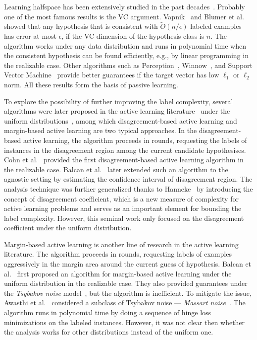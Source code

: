 \documentclass[11pt]{article}
\begin{document}
 Learning halfspace has been extensively studied in the past decades~\cite{blum1996polynomial,klivans2002learning,dunagan2004simple,kalai2008agnostically,shalev2010learning,kearns1994introduction,kearns1994toward,kearns1993learning}. Probably one of the most famous results is the VC argument. Vapnik~\cite{vapnik1982estimations} and Blumer et al.~\cite{blumer1989learnability} showed that any hypothesis that is consistent with $\widetilde O(n/\epsilon)$ labeled examples has error at most $\epsilon$, if the VC dimension of the hypothesis class is $n$. The algorithm works under any data distribution and runs in polynomial time when the consistent hypothesis can be found efficiently, e.g., by linear programming in the realizable case. Other algorithms such as Perception~\cite{minsky1987perceptrons}, Winnow~\cite{littlestone1988learning}, and Support Vector Machine~\cite{vapnik1998statistical} provide better guarantees if the target vector has low $\ell_1$ or $\ell_2$ norm. All these results form the basis of passive learning.

To explore the possibility of further improving the label complexity, several algorithms were later proposed in the active learning literature~\cite{beygelzimer2010agnostic,beygelzimer2016search} under the uniform distributions~\cite{dasgupta2005analysis,freund1993information},
among which disagreement-based active learning and margin-based active learning are two typical approaches. In the disagreement-based active learning, the algorithm proceeds in rounds, requesting the labels of instances in the disagreement region among the current candidate hypothesises.
Cohn et al.~\cite{cohn1994improving} provided the first disagreement-based active learning algorithm in the realizable case. Balcan et al.~\cite{balcan2009agnostic} later extended such an algorithm to the agnostic setting by estimating the confidence interval of disagreement region. The analysis technique was further generalized thanks to Hanneke~\cite{hanneke2007bound} by introducing the concept of disagreement coefficient, which is a new measure of complexity for active learning problems and serves as an important element for bounding the label complexity. However, this seminal work only focused on the disagreement coefficient under the uniform distribution.

Margin-based active learning is another line of research in the active learning literature. The algorithm proceeds in rounds, requesting labels of examples aggressively in the margin area around the current guess of hypothesis. Balcan et al.~\cite{balcan2007margin} first proposed an algorithm for margin-based active learning under the uniform distribution in the realizable case. They also provided guarantees under the \emph{Tsybakov noise} model~\cite{tsybakov2004optimal}, but the algorithm is inefficient. To mitigate the issue, Awasthi et al.~\cite{awasthi2015efficient} considered a subclass of Tsybakov noise --- \emph{Massart noise}~\cite{bousquet2005theory}. The algorithm runs in polynomial time by doing a sequence of hinge loss minimizations on the labeled instances. However, it was not clear then whether the analysis works for other distributions instead of the uniform one.
\end{document}
